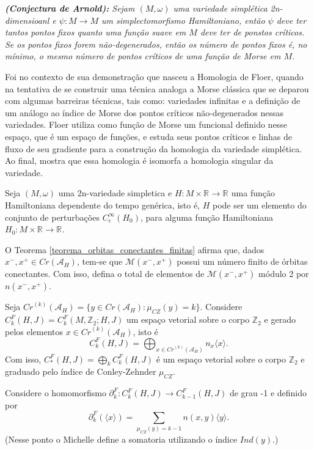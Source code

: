 \documentclass[12pt]{book}
\newcommand{\bordo}[1]{\partial_{#1}}
\newcommand{\energiafinitaM}{\mathcal{M}}
\newcommand{\energiafinitaMconectante}{\energiafinitaM(x^{-}, x^{+})}
\newcommand{\funcionalH}{\mathcal{A}_{H}}
\newcommand{\gerador}[1]{\langle #1\rangle}
\newcommand{\iconley}[1]{\iconleyabrev(#1)}
\newcommand{\iconleyabrev}{\mu_{CZ}}
\newcommand{\inteiros}{\mathbb{Z}}
\newcommand{\perturbacaoHamiltoniana}[1]{C^{\infty}_{\epsilon}(#1)}
\newcommand{\pontoscriticos}[1]{\textit{Cr}(#1)}
\newcommand{\pontoscriticosordem}[2]{\textit{Cr}^{(#1)}(#2)}
\newcommand{\real}[1]{\mathbb{R}^{#1}}
\newcommand{\reta}{\real{}}
\newcommand{\alerta}[1]{{\color{red}#1}}
\begin{document}
	\textit{\textbf{(Conjectura de Arnold):} Sejam $(M, \omega)$ uma variedade simplética 2n-dimensioanl e $\psi : M \to M $ um simplectomorfismo Hamiltoniano, então $\psi$ deve ter tantos pontos fixos quanto uma função suave em $M$ deve ter de ponstos críticos. Se os pontos fixos forem não-degenerados, então os número de pontos fixos é, no mínimo, o mesmo número de pontos críticos de uma função de Morse em $M$.}
	
	Foi no contexto de sua demonstração que nasceu a Homologia de Floer, quando na tentativa de se construir uma técnica analoga a  Morse clássica que se deparou com algumas barreiras técnicas, tais como: variedades infinitas e a definição de um análogo ao índice de Morse dos pontos críticos não-degenerados nessas variedades. Floer utiliza como função de Morse um funcional definido nesse espaço, que é um espaço de funções, e estuda seus pontos críticos e linhas de fluxo de seu gradiente para a construção da homologia da variedade simplética. Ao final, mostra que essa homologia é isomorfa a homologia singular da variedade.
	
	
	Seja $(M,\omega)$ uma 2n-variedade simpletica e $H: M\times \reta\to \reta$ uma função Hamiltoniana dependente do tempo genérica, isto é, $H$ pode ser um elemento do conjunto de perturbações $\perturbacaoHamiltoniana{H_{0}}$, para alguma função Hamiltoniana $H_{0}:M\times \reta \to \reta$.
	
	O Teorema \ref{teorema_orbitas_conectantes_finitas} afirma que, dados $x^{-},x^{+} \in \pontoscriticos{\funcionalH}$, tem-se que $\energiafinitaMconectante$ possui um número finito de órbitas conectantes. Com isso, defina o total de elementos de $\energiafinitaMconectante$ módulo 2 por $n(x^{-},x^{+})$.
	
	 Seja $\pontoscriticosordem{k}{\funcionalH} = \{ y \in \pontoscriticos{\funcionalH}: \iconley{y}=k\}$. Considere $C^{F}_{k}(H,J)=C^{F}_{k}(M, \inteiros_{2}; H,J)$ um espaço vetorial sobre o corpo $\inteiros_{2}$ e gerado pelos elementos $x \in \pontoscriticosordem{k}{\funcionalH} $, isto é
	$$
		C^{F}_{k}(H,J) = \bigoplus_{x\in \pontoscriticosordem{k}{\funcionalH} }n_{x}\gerador{x}.
	$$
	Com isso, $C^{F}_{*}(H,J)=\bigoplus_{k}C^{F}_{k}(H,J)$ é um espaço vetorial sobre o corpo $\inteiros_{2}$ e graduado pelo índice de Conley-Zehnder $\iconleyabrev$.

	Considere o homomorfismo $\bordo{k}^{F}: C^{F}_{k}(H,J)\to C^{F}_{k-1}(H,J)$ de grau -1 e definido por
	$$
	\bordo{k}^{F}(\gerador{x}) = \sum_{\iconley{y}=k-1}n(x,y)\gerador{y}.
	$$
	\alerta{(Nesse ponto o Michelle define a somatoria utilizando o índice $Ind(y)$.)}
	
\end{document}
